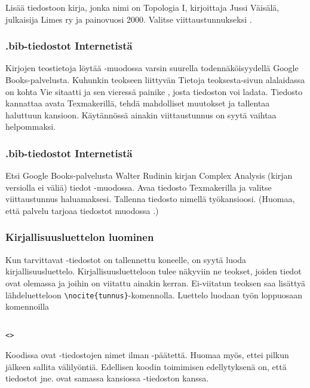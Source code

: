 \begin{fframe}
    \begin{harj}
        Lisää tiedostoon  kirja, jonka nimi on Topologia I, kirjoittaja Jussi Väisälä, julkaisija Limes ry ja painovuosi 2000. Valitse viittaustunnukseksi .
    \end{harj}
\end{fframe}

\begin{fframe}
    \frametitle{.bib-tiedostot Internetistä}
    Kirjojen teostietoja löytää \BibTeX -muodossa varsin suurella todennäköisyydellä Google Books-palvelusta. 
    \pause
    \vaihto
    Kuhunkin teokseen liittyvän Tietoja teoksesta-sivun alalaidassa on kohta Vie sitaatti ja sen vieressä painike \BibTeX, josta tiedoston voi ladata.
    \pause
    \vaihto
    Tiedosto kannattaa avata Texmakerillä, tehdä mahdolliset muutokset ja tallentaa haluttuun kansioon. 
    \vaihto
    Käytännössä ainakin viittaustunnus on syytä vaihtaa helpommaksi.
\end{fframe}

\begin{fframe}
    \frametitle{.bib-tiedostot Internetistä}
    \begin{harj}
        Etsi Google Books-palvelusta Walter Rudinin kirjan Complex Analysis (kirjan versiolla ei väliä) tiedot \BibTeX -muodossa. Avaa tiedosto Texmakerilla ja valitse viittaustunnus haluamaksesi. Tallenna tiedosto nimellä  työkansioosi. (Huomaa, että palvelu tarjoaa tiedostot muodossa .)
    \end{harj}
\end{fframe}

\begin{fframe}
    \frametitle{Kirjallisuusluettelon luominen}
    Kun tarvittavat -tiedostot on tallennettu koneelle, on syytä luoda kirjallisuusluettelo. Kirjallisuusluetteloon tulee näkyviin ne teokset, joiden tiedot ovat olemassa ja joihin on viitattu ainakin kerran. Ei-viitatun teoksen saa lisättyä lähdeluetteloon \lstinline-\nocite{tunnus}--komennolla.
    \pause
    \vaihto
    Luettelo luodaan työn loppuosaan komennoilla
    \begin{lstlisting}

<>
    \end{lstlisting}
    Koodissa  ovat -tiedostojen nimet ilman -päätettä. Huomaa myös, ettei pilkun jälkeen sallita välilyöntiä.
    \vaihto
    Edellisen koodin toimimisen edellytyksenä on, että tiedostot  jne. ovat samassa kansiossa -tiedoston kanssa. 
\end{fframe}

